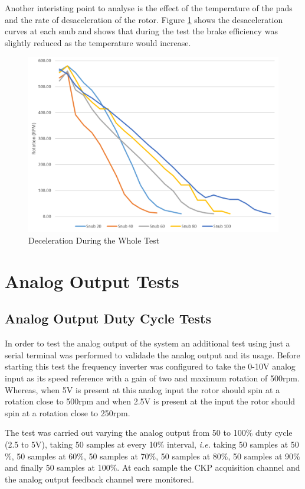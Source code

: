 		Another interisting point to analyse is the effect of the temperature of the pads and the rate of desaceleration of the rotor. Figure \ref{fig:snubs-rotation} shows the desaceleration curves at each snub and shows that during the test the brake efficiency was slightly reduced as the temperature would increase.

		\begin{figure}[htbp]
				\centering
				\includegraphics[width=.8\textwidth]{figuras/fig-snubs-rotation}
				\caption{Deceleration During the Whole Test}
				\label{fig:snubs-rotation}
		\end{figure}

\section{Analog Output Tests}\label{sec:analog-output-test}
	
	\subsection{Analog Output Duty Cycle Tests}\label{sec:duty-cycle-test}

		In order to test the analog output of the system an additional test using just a serial terminal was performed to validade the analog output and its usage. Before starting this test the frequency inverter was configured to take the 0-10V analog input as its speed reference with a gain of two and maximum rotation of 500rpm. Whereas, when 5V is present at this analog input the rotor should spin at a rotation close to 500rpm and when 2.5V is present at the input the rotor should spin at a rotation close to 250rpm.
		\par
		The test was carried out varying the analog output from 50 to 100$\%$ duty cycle (2.5 to 5V), taking 50 samples at every 10$\%$ interval, \textit{i.e.} taking 50 samples at 50$\%$, 50 samples at 60$\%$, 50 samples at 70$\%$, 50 samples at 80$\%$, 50 samples at 90$\%$ and finally 50 samples at 100$\%$. At each sample the CKP acquisition channel and the analog output feedback channel were monitored.
	
